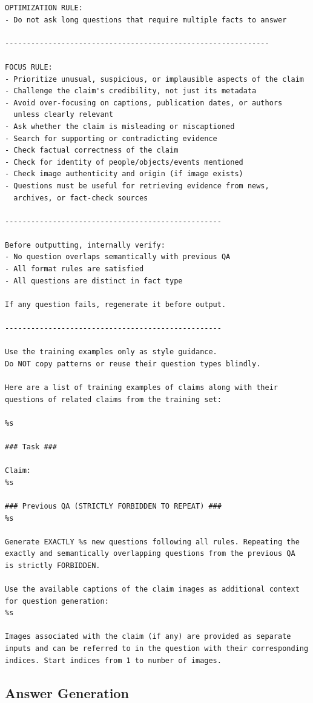 \begin{verbatim}
OPTIMIZATION RULE:
- Do not ask long questions that require multiple facts to answer

-------------------------------------------------------------

FOCUS RULE:
- Prioritize unusual, suspicious, or implausible aspects of the claim
- Challenge the claim's credibility, not just its metadata
- Avoid over-focusing on captions, publication dates, or authors
  unless clearly relevant
- Ask whether the claim is misleading or miscaptioned
- Search for supporting or contradicting evidence
- Check factual correctness of the claim
- Check for identity of people/objects/events mentioned
- Check image authenticity and origin (if image exists)
- Questions must be useful for retrieving evidence from news,
  archives, or fact-check sources

--------------------------------------------------

Before outputting, internally verify:
- No question overlaps semantically with previous QA
- All format rules are satisfied
- All questions are distinct in fact type

If any question fails, regenerate it before output.

--------------------------------------------------

Use the training examples only as style guidance.
Do NOT copy patterns or reuse their question types blindly.

Here are a list of training examples of claims along with their
questions of related claims from the training set:

%s

### Task ###

Claim:
%s

### Previous QA (STRICTLY FORBIDDEN TO REPEAT) ###
%s

Generate EXACTLY %s new questions following all rules. Repeating the
exactly and semantically overlapping questions from the previous QA
is strictly FORBIDDEN.

Use the available captions of the claim images as additional context
for question generation:
%s

Images associated with the claim (if any) are provided as separate
inputs and can be referred to in the question with their corresponding
indices. Start indices from 1 to number of images.
\end{verbatim}

\subsection{Answer Generation}

